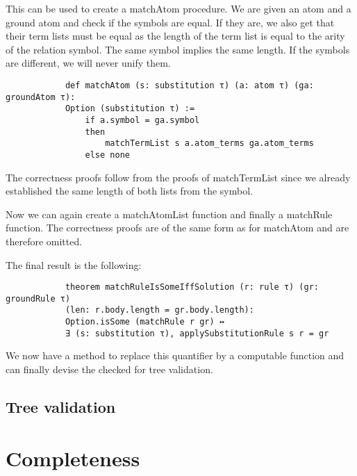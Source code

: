 \documentclass{article}
\begin{document}
        This can be used to create a matchAtom procedure. We are given an atom and a ground atom and check if the symbols are equal. If they are, we also get that their term lists must be equal as the length of the term list is equal to the arity of the relation symbol. The same symbol implies the same length.
        If the symbols are different, we will never unify them.

        \begin{lstlisting}
            def matchAtom (s: substitution τ) (a: atom τ) (ga: groundAtom τ):
            Option (substitution τ) :=
                if a.symbol = ga.symbol
                then
                    matchTermList s a.atom_terms ga.atom_terms
                else none
        \end{lstlisting}

        The correctness proofs follow from the proofs of matchTermList since we already established the same length of both lists from the symbol.

        Now we can again create a matchAtomList function and finally a matchRule function. The correctness proofs are of the same form as for matchAtom and are therefore omitted.

        The final result is the following:
        \begin{lstlisting}
            theorem matchRuleIsSomeIffSolution (r: rule τ) (gr: groundRule τ) 
            (len: r.body.length = gr.body.length): 
            Option.isSome (matchRule r gr) ↔ 
            ∃ (s: substitution τ), applySubstitutionRule s r = gr
        \end{lstlisting}

        We now have a method to replace this quantifier by a computable function and can finally devise the checked for tree validation.

        \subsection{Tree validation}

    \section{Completeness}
\end{document}
